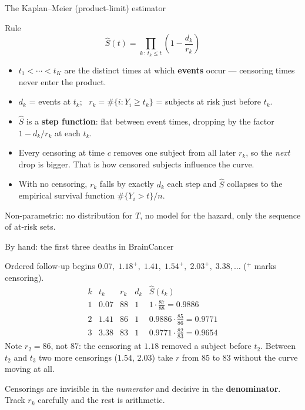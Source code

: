 \documentclass[aspectratio=169,11pt]{beamer}
\begin{document}
\begin{frame}{The Kaplan--Meier (product-limit) estimator}
  \scriptsize
  \begin{block}{Rule}
    \[
      \boxed{\;\hat S(t)=\prod_{k\,:\,t_k\le t}\left(1-\frac{d_k}{r_k}\right)\;}
    \]
  \end{block}
  \begin{readme}
    \begin{itemize}
      \item $t_1<\cdots<t_K$ are the distinct times at which \textbf{events} occur ---
            censoring times never enter the product.
      \item $d_k$ = events at $t_k$; \ $r_k=\#\{i: Y_i\ge t_k\}$ = subjects at risk just
            before $t_k$.
      \item $\hat S$ is a \textbf{step function}: flat between event times, dropping by
            the factor $1-d_k/r_k$ at each $t_k$.
      \item Every censoring at time $c$ removes one subject from all later $r_k$, so the
            \emph{next} drop is bigger. That is how censored subjects influence the curve.
      \item With no censoring, $r_k$ falls by exactly $d_k$ each step and $\hat S$
            collapses to the empirical survival function $\#\{Y_i>t\}/n$.
    \end{itemize}
  \end{readme}
  \begin{takeaway}
    Non-parametric: no distribution for $T$, no model for the hazard, only the
    sequence of at-risk sets.
  \end{takeaway}
\end{frame}

\begin{frame}{By hand: the first three deaths in BrainCancer}
  \begin{numexample}
    Ordered follow-up begins
    $0.07,\;1.18^{+},\;1.41,\;1.54^{+},\;2.03^{+},\;3.38,\dots$ ($^{+}$ marks censoring).
    \[
      \begin{array}{c|c|c|c|l}
        k & t_k & r_k & d_k & \hat S(t_k)\\ \hline
        1 & 0.07 & 88 & 1 & 1\cdot\tfrac{87}{88}=0.9886\\
        2 & 1.41 & 86 & 1 & 0.9886\cdot\tfrac{85}{86}=0.9771\\
        3 & 3.38 & 83 & 1 & 0.9771\cdot\tfrac{82}{83}=0.9654
      \end{array}
    \]
    Note $r_2=86$, not $87$: the censoring at $1.18$ removed a subject before $t_2$.
    Between $t_2$ and $t_3$ two more censorings ($1.54$, $2.03$) take $r$ from $85$ to $83$
    without the curve moving at all.
  \end{numexample}
  \begin{takeaway}
    Censorings are invisible in the \emph{numerator} and decisive in the
    \textbf{denominator}. Track $r_k$ carefully and the rest is arithmetic.
  \end{takeaway}
\end{frame}
\end{document}
